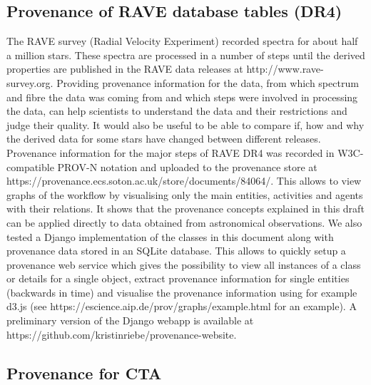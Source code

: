 %


\subsection{Provenance of RAVE database tables (DR4)}
The RAVE survey (Radial Velocity Experiment) recorded spectra for about half a 
million stars. These spectra are processed in a number of steps until the 
derived properties are published in the RAVE data releases at http://www.rave-survey.org.
Providing provenance information for the data, from which spectrum and fibre the
data was coming from and which steps were involved in processing the data, can help scientists
to understand the data and their restrictions and judge their quality.
It would also be useful to be able to compare if, how and why the derived data 
for some stars have changed between different releases.
Provenance information for the major steps of RAVE DR4 was recorded in W3C-compatible 
PROV-N notation and uploaded to the provenance store at 
https://provenance.ecs.soton.ac.uk/store/documents/84064/. This allows to view 
graphs of the workflow by visualising only the main entities, activities and agents 
with their relations. It shows that the provenance concepts explained in this draft 
can be applied directly to data obtained from astronomical observations.
We also tested a Django implementation of the classes in this document along with provenance data 
stored in an SQLite database. This allows to quickly setup a provenance web service
which gives the possibility to view all instances of a class or details for a single object, 
extract provenance information for single entities (backwards in time) and 
visualise the provenance information using for example d3.js (see https://escience.aip.de/prov/graphs/example.html for an example).
A preliminary version of the Django webapp is available at https://github.com/kristinriebe/provenance-website.



\subsection{Provenance for CTA}

